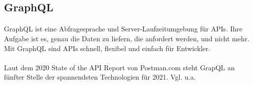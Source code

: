 \subsection{GraphQL}
\paragraph{}
GraphQL ist eine Abfragesprache und Server-Laufzeitumgebung für APIs.
Ihre Aufgabe ist es, genau die Daten zu liefern, die anfordert werden, und nicht mehr.
\\
Mit GraphQL sind APIs schnell, flexibel und einfach für Entwickler.
\\ \\
Laut dem 2020 State of the API Report von Postman.com steht GrapQL an fünfter Stelle der spannendsten Technologien für 2021.
  {Vgl. u.a. \cite{PM1}}

